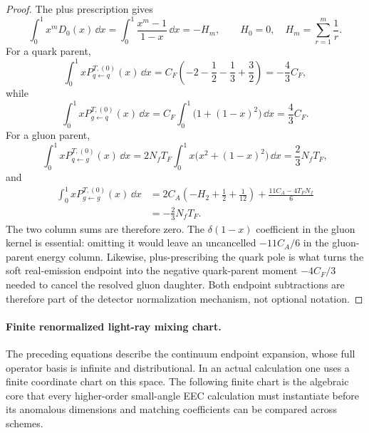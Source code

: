 \begin{proof}
The plus prescription gives
\[
  \int_0^1x^mD_0(x)\,\dd x
  =
  \int_0^1\frac{x^m-1}{1-x}\,\dd x
  =
  -H_m,
  \qquad H_0=0,\quad H_m=\sum_{r=1}^m\frac1r .
\]
For a quark parent,
\[
  \int_0^1xP^{T,(0)}_{q\leftarrow q}(x)\,\dd x
  =
  C_F\left(-2-\frac12-\frac13+\frac32\right)
  =
  -\frac43C_F,
\]
while
\[
  \int_0^1xP^{T,(0)}_{g\leftarrow q}(x)\,\dd x
  =
  C_F\int_0^1\bigl(1+(1-x)^2\bigr)\,\dd x
  =
  \frac43C_F .
\]
For a gluon parent,
\[
  \int_0^1xP^{T,(0)}_{q\leftarrow g}(x)\,\dd x
  =
  2N_fT_F
  \int_0^1x\bigl(x^2+(1-x)^2\bigr)\,\dd x
  =
  \frac23N_fT_F,
\]
and
\[
\begin{aligned}
  \int_0^1xP^{T,(0)}_{g\leftarrow g}(x)\,\dd x
  &=
  2C_A\left(-H_2+\frac12+\frac1{12}\right)
  +
  \frac{11C_A-4T_FN_f}{6} \\
  &=
  -\frac23N_fT_F .
\end{aligned}
\]
The two column sums are therefore zero.  The \(\delta(1-x)\) coefficient in
the gluon kernel is essential: omitting it would leave an uncancelled
\(-11C_A/6\) in the gluon-parent energy column.  Likewise, plus-prescribing
the quark pole is what turns the soft real-emission endpoint into the
negative quark-parent moment \(-4C_F/3\) needed to cancel the resolved gluon
daughter.  Both endpoint subtractions are therefore part of the detector
normalization mechanism, not optional notation.
\end{proof}

\paragraph{Finite renormalized light-ray mixing chart.}
The preceding equations describe the continuum endpoint expansion, whose full
operator basis is infinite and distributional.  In an actual calculation one
uses a finite coordinate chart on this space.  The following finite chart is
the algebraic core that every higher-order small-angle EEC calculation must
instantiate before its anomalous dimensions and matching coefficients can be
compared across schemes.

